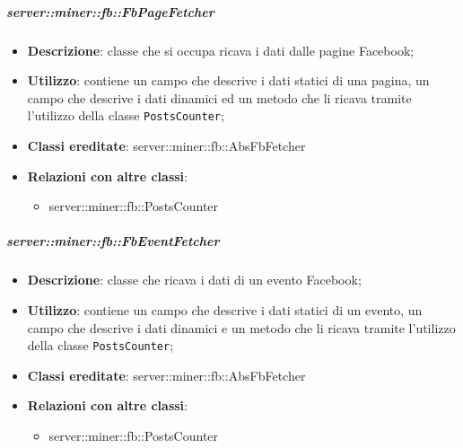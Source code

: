		\subparagraph{server::miner::fb::FbPageFetcher} %
		\label{subp:server_miner_fb_FbPageFetcher}
			\begin{itemize}
				\item \textbf{Descrizione}: classe che si occupa ricava i dati dalle pagine Facebook;
				\item \textbf{Utilizzo}: contiene un campo che descrive i dati statici di una pagina, un campo che descrive i dati dinamici ed un metodo che li ricava tramite l'utilizzo della classe \texttt{PostsCounter};
				\item \textbf{Classi ereditate}: server::miner::fb::AbsFbFetcher
				\item \textbf{Relazioni con altre classi}:
					\begin{itemize}
						\item server::miner::fb::PostsCounter
					\end{itemize}
			\end{itemize}

		\subparagraph{server::miner::fb::FbEventFetcher} %
		\label{subp:server_miner_fb_FbEventFetcher}
			\begin{itemize}
				\item \textbf{Descrizione}: classe che ricava i dati di un evento Facebook;
				\item \textbf{Utilizzo}: contiene un campo che descrive i dati statici di un evento, un campo che descrive i dati dinamici e un metodo che li ricava tramite l'utilizzo della classe \texttt{PostsCounter};
				\item \textbf{Classi ereditate}: server::miner::fb::AbsFbFetcher
				\item \textbf{Relazioni con altre classi}:
					\begin{itemize}
						\item server::miner::fb::PostsCounter
					\end{itemize}
			\end{itemize}

